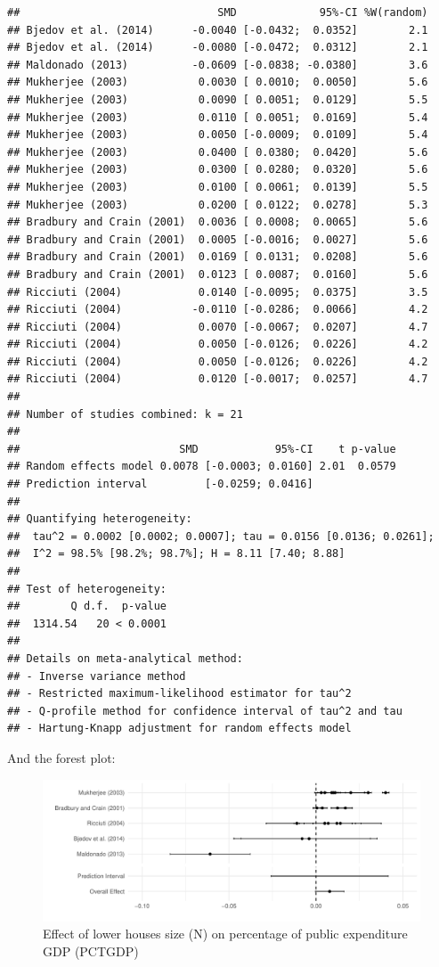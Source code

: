 \documentclass[
]{article}
\begin{document}
\begin{verbatim}
##                               SMD             95%-CI %W(random)
## Bjedov et al. (2014)      -0.0040 [-0.0432;  0.0352]        2.1
## Bjedov et al. (2014)      -0.0080 [-0.0472;  0.0312]        2.1
## Maldonado (2013)          -0.0609 [-0.0838; -0.0380]        3.6
## Mukherjee (2003)           0.0030 [ 0.0010;  0.0050]        5.6
## Mukherjee (2003)           0.0090 [ 0.0051;  0.0129]        5.5
## Mukherjee (2003)           0.0110 [ 0.0051;  0.0169]        5.4
## Mukherjee (2003)           0.0050 [-0.0009;  0.0109]        5.4
## Mukherjee (2003)           0.0400 [ 0.0380;  0.0420]        5.6
## Mukherjee (2003)           0.0300 [ 0.0280;  0.0320]        5.6
## Mukherjee (2003)           0.0100 [ 0.0061;  0.0139]        5.5
## Mukherjee (2003)           0.0200 [ 0.0122;  0.0278]        5.3
## Bradbury and Crain (2001)  0.0036 [ 0.0008;  0.0065]        5.6
## Bradbury and Crain (2001)  0.0005 [-0.0016;  0.0027]        5.6
## Bradbury and Crain (2001)  0.0169 [ 0.0131;  0.0208]        5.6
## Bradbury and Crain (2001)  0.0123 [ 0.0087;  0.0160]        5.6
## Ricciuti (2004)            0.0140 [-0.0095;  0.0375]        3.5
## Ricciuti (2004)           -0.0110 [-0.0286;  0.0066]        4.2
## Ricciuti (2004)            0.0070 [-0.0067;  0.0207]        4.7
## Ricciuti (2004)            0.0050 [-0.0126;  0.0226]        4.2
## Ricciuti (2004)            0.0050 [-0.0126;  0.0226]        4.2
## Ricciuti (2004)            0.0120 [-0.0017;  0.0257]        4.7
## 
## Number of studies combined: k = 21
## 
##                         SMD            95%-CI    t p-value
## Random effects model 0.0078 [-0.0003; 0.0160] 2.01  0.0579
## Prediction interval         [-0.0259; 0.0416]             
## 
## Quantifying heterogeneity:
##  tau^2 = 0.0002 [0.0002; 0.0007]; tau = 0.0156 [0.0136; 0.0261];
##  I^2 = 98.5% [98.2%; 98.7%]; H = 8.11 [7.40; 8.88]
## 
## Test of heterogeneity:
##        Q d.f.  p-value
##  1314.54   20 < 0.0001
## 
## Details on meta-analytical method:
## - Inverse variance method
## - Restricted maximum-likelihood estimator for tau^2
## - Q-profile method for confidence interval of tau^2 and tau
## - Hartung-Knapp adjustment for random effects model
\end{verbatim}

And the forest plot:

\begin{figure}
\centering
\includegraphics{appendixV5_files/figure-latex/unnamed-chunk-35-1.pdf}
\caption{Effect of lower houses size (N) on percentage of public
expenditure GDP (PCTGDP)}
\end{figure}
\end{document}

